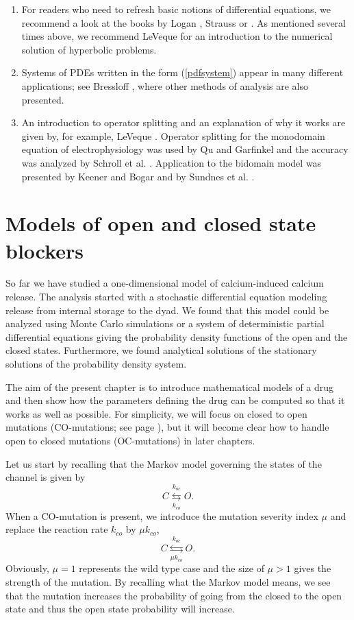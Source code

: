 \begin{enumerate}
\item For readers who need to refresh basic notions of differential equations, we recommend a look at the books by Logan \cite{Logan2014}, Strauss \cite{Strauss2008} or \cite{Tveito2005,Tveito2010}. As mentioned several times above, we recommend LeVeque \cite{LeVeque2002} for an introduction to the  numerical solution of hyperbolic problems.
\item Systems of PDEs written in the form (\ref{pdfsystem}) appear in many different applications; see Bressloff \cite{Bressloff2014}, where other methods of analysis are also presented.
\item An introduction to operator splitting and an explanation of why it works are given by, for example,  LeVeque \cite{LeVeque2002}. Operator splitting for the monodomain equation of electrophysiology  was used by Qu and Garfinkel \cite{Qu1999} and the accuracy was analyzed by Schroll et al. \cite{Schroll2007}. Application to the bidomain model was presented by Keener and Bogar \cite{Keener1998} and by  Sundnes et al. \cite{Sundnes2005}.
\end{enumerate}


\chapter{Models of open and closed state blockers}

So far we have studied a one-dimensional model of calcium-induced calcium release. The analysis started with a stochastic differential equation modeling release from internal storage to the dyad. We found that this model could be analyzed using Monte Carlo simulations or a system of deterministic partial differential equations giving the probability density functions of the open and the closed states. Furthermore, we found analytical solutions of the stationary solutions of the probability density system. 

The aim of the present chapter is to introduce mathematical models of a drug and then show how the parameters defining the drug can be computed so that it works as well as possible. 
For simplicity, we will focus on closed to open mutations (CO-mutations; see page \pageref{com}), but it will become clear how to handle open to closed mutations (OC-mutations) in later chapters.


Let us start by recalling that the Markov model governing the states of the channel is given by
\begin{equation}
C\underset{k_{co}}{\overset{k_{oc}}{\leftrightarrows}}O. \label{Markov22}%
\end{equation}
When a CO-mutation is present, we introduce the mutation severity index $\mu$ and replace the reaction rate $k_{co}$ by $\mu k_{co}$,
\begin{equation}
C\underset{\mu k_{co}}{\overset{k_{oc}}{\leftrightarrows}}O. \label{Markov23}%
\end{equation}
Obviously, $\mu=1$ represents the wild type case and the size of $\mu >1$ gives the strength of the mutation. By recalling what the Markov model means, we see that the mutation increases the probability of going from the closed to the open state and thus the open state probability will increase.


